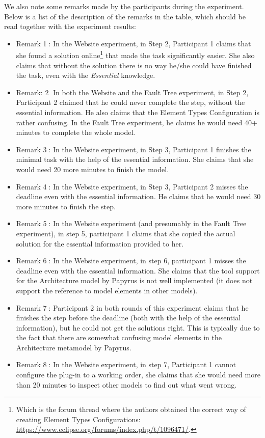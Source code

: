 We also note some remarks made by the participants during the experiment.
Below is a list of the description of the remarks in the table, which should be read together with the experiment results:
\begin{itemize}
	\item Remark \textcircled{1}: In the Website experiment, in Step 2, Participant 1 claims that she found a solution online\footnote{Which is the forum thread where the authors obtained the correct way of creating Element Types Configurations: \url{https://www.eclipse.org/forums/index.php/t/1096471/}.} that made the task significantly easier. 
	She also claims that without the solution there is no way he/she could have finished the task, even with the \textit{Essential} knowledge.
	\item Remark: \textcircled{2} In both the Website and the Fault Tree experiment, in Step 2, Participant 2 claimed that he could never complete the step, without the essential information. 
	He also claims that the Element Types Configuration is rather confusing.
	In the Fault Tree experiment, he claims he would need 40+ minutes to complete the whole model.
	\item Remark \textcircled{3}: In the Website experiment, in Step 3, Participant 1 finishes the minimal task with the help of the essential information. She	claims that she would need 20 more minutes to finish the model.
	\item Remark \textcircled{4}: In the Website experiment, in Step 3, Participant 2 misses the deadline even with the essential information.
	He claims that he would need 30 more minutes to finish the step.
	\item Remark \textcircled{5}: In the Website experiment (and presumably in the Fault Tree experiment), in step 5, participant 1 claims that she copied the actual solution for the essential information provided to her.
	\item Remark \textcircled{6}: In the Website experiment, in step 6, participant 1 misses the deadline even with the essential information. 
	She claims that the tool support for the Architecture model by Papyrus is not well implemented (it does not support the reference to model elements in other models).
	\item Remark \textcircled{7}: Participant 2 in both rounds of this experiment claims that he finishes the step before the deadline (both with the help of the essential information), but he could not get the solutions right. 
	This is typically due to the fact that there are somewhat confusing model elements in the Architecture metamodel by Papyrus.
	\item Remark \textcircled{8}: In the Website experiment, in step 7, Participant 1 cannot configure the plug-in to a working order, she claims that she would need more than 20 minutes to inspect other models to find out what went wrong.
\end{itemize}
